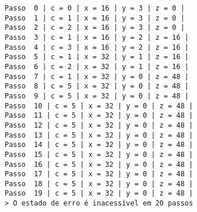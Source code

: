 \documentclass[11pt]{article}
\begin{document}
    \begin{Verbatim}[commandchars=\\\{\}]
Passo  0 | c = 0 | x = 16 | y = 3 | z = 0 |
Passo  1 | c = 1 | x = 16 | y = 3 | z = 0 |
Passo  2 | c = 2 | x = 16 | y = 3 | z = 0 |
Passo  3 | c = 1 | x = 16 | y = 2 | z = 16 |
Passo  4 | c = 3 | x = 16 | y = 2 | z = 16 |
Passo  5 | c = 1 | x = 32 | y = 1 | z = 16 |
Passo  6 | c = 2 | x = 32 | y = 1 | z = 16 |
Passo  7 | c = 1 | x = 32 | y = 0 | z = 48 |
Passo  8 | c = 5 | x = 32 | y = 0 | z = 48 |
Passo  9 | c = 5 | x = 32 | y = 0 | z = 48 |
Passo  10 | c = 5 | x = 32 | y = 0 | z = 48 |
Passo  11 | c = 5 | x = 32 | y = 0 | z = 48 |
Passo  12 | c = 5 | x = 32 | y = 0 | z = 48 |
Passo  13 | c = 5 | x = 32 | y = 0 | z = 48 |
Passo  14 | c = 5 | x = 32 | y = 0 | z = 48 |
Passo  15 | c = 5 | x = 32 | y = 0 | z = 48 |
Passo  16 | c = 5 | x = 32 | y = 0 | z = 48 |
Passo  17 | c = 5 | x = 32 | y = 0 | z = 48 |
Passo  18 | c = 5 | x = 32 | y = 0 | z = 48 |
Passo  19 | c = 5 | x = 32 | y = 0 | z = 48 |
> O estado de erro é inacessível em 20 passos
    \end{Verbatim}


    
    
    
\end{document}
